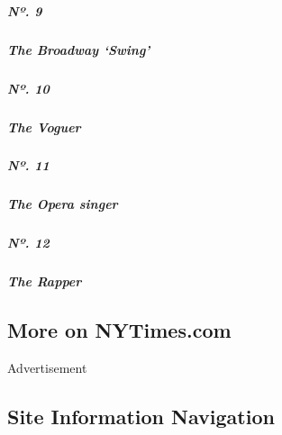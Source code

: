 \href{https://www.nytimes3xbfgragh.onion/interactive/2019/05/30/magazine/aladdin-musical-new-york.html}{}

\hypertarget{nuxba-9}{%
\subparagraph{Nº. 9}\label{nuxba-9}}

\hypertarget{the-broadway-swing}{%
\subparagraph{The Broadway `Swing'}\label{the-broadway-swing}}

\href{https://www.nytimes3xbfgragh.onion/interactive/2019/05/30/magazine/vogue-kiki-new-york.html}{}

\hypertarget{nuxba-10}{%
\subparagraph{Nº. 10}\label{nuxba-10}}

\hypertarget{the-voguer}{%
\subparagraph{The Voguer}\label{the-voguer}}

\href{https://www.nytimes3xbfgragh.onion/interactive/2019/05/30/magazine/metropolitan-opera-singer-new-york.html}{}

\hypertarget{nuxba-11}{%
\subparagraph{Nº. 11}\label{nuxba-11}}

\hypertarget{the-opera-singer}{%
\subparagraph{The Opera singer}\label{the-opera-singer}}

\href{https://www.nytimes3xbfgragh.onion/interactive/2019/05/30/magazine/princess-nokia-new-york.html}{}

\hypertarget{nuxba-12}{%
\subparagraph{Nº. 12}\label{nuxba-12}}

\hypertarget{the-rapper}{%
\subparagraph{The Rapper}\label{the-rapper}}

\hypertarget{more-on-nytimescom}{%
\subsection{More on NYTimes.com}\label{more-on-nytimescom}}

Advertisement

\hypertarget{site-information-navigation}{%
\subsection{Site Information
Navigation}\label{site-information-navigation}}

